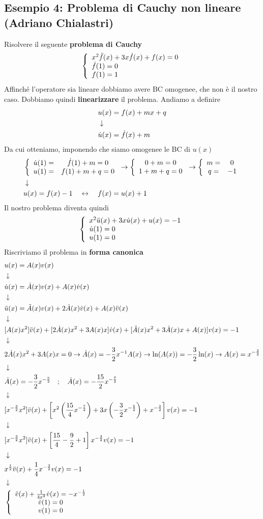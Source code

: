 \subsection{Esempio 4: Problema di Cauchy non lineare (Adriano Chialastri)}
Risolvere il seguente \textbf{problema di Cauchy}
\begin{align}
	\triple{x^2 \ddot{f}(x) + 3x \dot{f}(x) + f(x) = 0}{\dot{f}(1)=0\hfill}{f(1) =1\hfill}
\end{align}
Affinché l'operatore sia lineare dobbiamo avere BC omogenee, che non è il nostro caso. Dobbiamo quindi \textbf{linearizzare} il problema. Andiamo a definire
\begin{align}
	&u(x) = f(x) + mx + q\\ &\downarrow \nonumber \\
	&\dot{u}(x) = \dot{f}(x) + m
\end{align}	
Da cui otteniamo, imponendo che siamo omogenee le BC di $u(x)$
\begin{align}
	&\left\{ \begin{array}{cc} \dot{u}(1) =& \dot{f}(1) + m =0\\ u(1) =& f(1) + m + q=0 \end{array} \right. \to \left\{ \begin{array}{cc} 0 + m=0 \\ 1 + m + q=0 \end{array} \right. \to \left\{ \begin{array}{cc} m=& 0\\ q=& -1 \end{array} \right. \\ &\downarrow \nonumber \\
	&u(x) = f(x) -1 \quad \leftrightarrow \quad f(x) = u(x)+1
\end{align}	
Il nostro problema diventa quindi
\begin{align}
	\triple{x^2 \ddot{u}(x) + 3x \dot{u}(x) + u(x) = -1}{\dot{u}(1)=0\hfill}{u(1) = 0\hfill}
\end{align}
Riscriviamo il problema in \textbf{forma canonica}
\begin{align}
	&u(x) = A(x)v(x)\\ &\downarrow \nonumber \\
	&\dot{u}(x) = \dot{A}(x) v(x) + A(x) \dot{v}(x)\nonumber \\ &\downarrow \nonumber \\
	&\ddot{u}(x) = \ddot{A}(x) v(x) + 2\dot{A}(x) \dot{v}(x) + A(x) \ddot{v}(x)\nonumber \\ &\downarrow \nonumber \\
	&[A(x) x^2] \ddot{v}(x) + [2\dot{A}(x) x^2 + 3A(x)x ]\dot{v}(x) + [\ddot{A}(x)x^2 + 3\dot{A}(x)x + A(x)]v(x) = -1 \nonumber \\ &\downarrow \nonumber \\
	&2\dot{A}(x) x^2 + 3A(x)x=0 \to \dot{A}(x) = -\frac{3}{2}x^{-1}A(x) \to \ln(A(x)) = -\frac{3}{2} \ln(x)  \to A(x)= x^{-\frac{3}{2}} \nonumber \\ &\downarrow \nonumber \\
	&\dot{A}(x) = -\frac{3}{2}x^{-\frac{5}{2}} \quad ; \quad \dot{A}(x) = -\frac{15}{2}x^{-\frac{7}{2}} \nonumber \\ &\downarrow \nonumber \\
	&[x^{-\frac{3}{2}} x^2] \ddot{v}(x) + \left[x^2\left( \frac{15}{4}x^{-\frac{7}{2}} \right) + 3x \left( -\frac{3}{2} x^{-\frac{5}{2}} \right) + x^{-\frac{3}{2}} \right] v(x) = -1 \nonumber \\ &\downarrow \nonumber \\
	&[x^{-\frac{3}{2}} x^2] \ddot{v}(x) + \left[\frac{15}{4} -\frac{9}{2} +1 \right] x^{-\frac{3}{2}} v(x) = -1 \nonumber \\ &\downarrow \nonumber \\
	&x^{\frac{1}{2}} \ddot{v}(x) + \frac{1}{4}x^{-\frac{3}{2}} v(x) = -1 \nonumber \\ &\downarrow \nonumber \\
	&\left\{ \begin{array}{ccc} \ddot{v}(x) + \frac{1}{4x^2} \dot{v}(x)  = -x ^{-\frac{1}{2}}\\ \dot{v}(1)=0\\ v(1) = 0 \end{array} \right.
\end{align}
